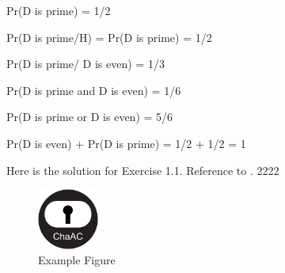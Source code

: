\documentclass[12pt,a4paper]{article}
\begin{document}
  
  	Pr(D is prime) = 1/2

  
  	Pr(D is prime/H) = Pr(D is prime) = 1/2
	

  	Pr(D is prime/ D is even) = 1/3


  	Pr(D is prime and D is even) = 1/6


  	Pr(D is prime or D is even) = 5/6


 	Pr(D is even) + Pr(D is prime) = 1/2 + 1/2 = 1




 \exercise
 	Here is the solution for Exercise 1.1. Reference to .
 	2222

 	\begin{figure}[h]
 		\center
 		\includegraphics[width=2cm]{figures/logo}
 		\caption{Example Figure}
 		\label{fig:Example}	
 	\end{figure}

 \exercise

 \exercise
 
 \exercise
 \exercise
\end{document}
